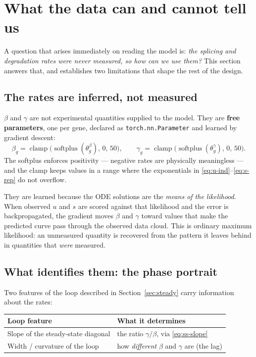\documentclass[11pt,a4paper]{article}
\newcommand{\uns}{u}
\newcommand{\spl}{s}
\newcommand{\softplus}{\operatorname{softplus}}
\theoremstyle{definition}
\begin{document}
\section{What the data can and cannot tell us}
\label{sec:identifiability}

A question that arises immediately on reading the model is: \emph{the splicing
and degradation rates were never measured, so how can we use them?} This
section answers that, and establishes two limitations that shape the rest of
the design.

\subsection{The rates are inferred, not measured}

$\beta$ and $\gamma$ are not experimental quantities supplied to the model.
They are \textbf{free parameters}, one per gene, declared as
\texttt{torch.nn.Parameter} and learned by gradient descent:
%
\begin{equation}
\beta_g = \operatorname{clamp}\big(\softplus(\theta^\beta_g),\, 0,\, 50\big),
\qquad
\gamma_g = \operatorname{clamp}\big(\softplus(\theta^\gamma_g),\, 0,\, 50\big).
\end{equation}
%
The softplus enforces positivity --- negative rates are physically meaningless
--- and the clamp keeps values in a range where the exponentials in
\eqref{eq:u-ind}--\eqref{eq:s-rep} do not overflow.

They are learned because the ODE solutions are the \emph{means of the
likelihood}. When observed $\uns$ and $\spl$ are scored against that likelihood
and the error is backpropagated, the gradient moves $\beta$ and $\gamma$
toward values that make the predicted curve pass through the observed data
cloud. This is ordinary maximum likelihood: an unmeasured quantity is
recovered from the pattern it leaves behind in quantities that \emph{were}
measured.

\subsection{What identifies them: the phase portrait}

Two features of the loop described in Section~\ref{sec:steady} carry
information about the rates:

\begin{center}
\begin{tabular}{@{}ll@{}}
\toprule
\textbf{Loop feature} & \textbf{What it determines} \\
\midrule
Slope of the steady-state diagonal & the ratio $\gamma/\beta$, via \eqref{eq:ss-slope} \\
Width / curvature of the loop & how \emph{different} $\beta$ and $\gamma$ are (the lag) \\
\bottomrule
\end{tabular}
\end{center}
\end{document}
